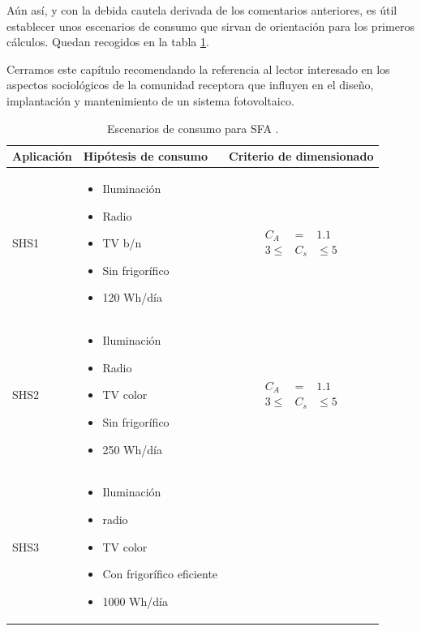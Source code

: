 Aún así, y con la debida cautela derivada de los comentarios anteriores,
es útil establecer unos escenarios de consumo que sirvan de orientación
para los primeros cálculos. Quedan recogidos en la tabla \ref{tab:Escenarios-de-consumo}. 

Cerramos este capítulo recomendando la referencia \citep{IngenieriaSinFronteras1999}
al lector interesado en los aspectos sociológicos de la comunidad
receptora que influyen en el diseño, implantación y mantenimiento
de un sistema fotovoltaico.

%
\begin{table}
\caption[Escenarios de consumo para SFA.]{Escenarios de consumo para SFA \citep{Lorenzo2006c}.\label{tab:Escenarios-de-consumo}}


\begin{tabular}{>{\centering}p{2cm}>{\centering}p{6cm}>{\centering}p{3cm}}
\toprule 
Aplicación & Hipótesis de consumo & Criterio de dimensionado\tabularnewline
\midrule
\midrule 
SHS1 & \begin{itemize}
\item Iluminación
\item Radio 
\item TV b/n
\item Sin frigorífico
\item 120 Wh/día
\end{itemize}
 & \begin{eqnarray*}
C_{A} & = & 1.1\\
3\leq & C_{s} & \leq5\end{eqnarray*}
\tabularnewline
\midrule 
SHS2 & \begin{itemize}
\item Iluminación
\item Radio
\item TV color
\item Sin frigorífico
\item 250 Wh/día
\end{itemize}
 & \begin{eqnarray*}
C_{A} & = & 1.1\\
3\leq & C_{s} & \leq5\end{eqnarray*}
\tabularnewline
\midrule 
SHS3 & \begin{itemize}
\item Iluminación
\item radio
\item TV color
\item Con frigorífico eficiente
\item 1000 Wh/día

\end{itemize}
\end{tabular}
\end{table}
